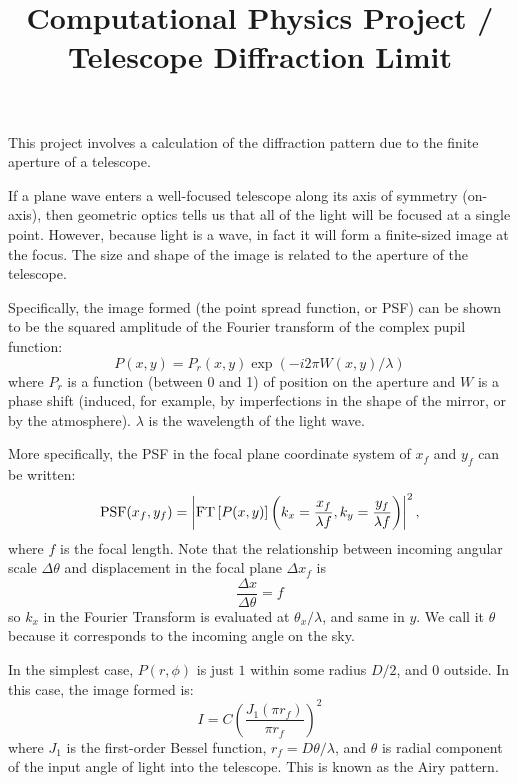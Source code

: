 \documentclass[11pt, preprint]{aastex}
\begin{document}
\title{\bf Computational Physics Project / Telescope Diffraction Limit}

This project involves a calculation of the diffraction pattern due to
the finite aperture of a telescope.

If a plane wave enters a well-focused telescope along its axis of
symmetry (on-axis), then geometric optics tells us that all of the
light will be focused at a single point. However, because light is a
wave, in fact it will form a finite-sized image at the focus. The size
and shape of the image is related to the aperture of the telescope.

Specifically, the image formed (the point spread function, or PSF) can
be shown to be the squared amplitude of the Fourier transform of the
complex pupil function:
\begin{equation}
P(x,y) = P_r(x, y) \exp\left(-i 2\pi W(x, y) / \lambda\right)
\end{equation}
where $P_r$ is a function (between 0 and 1) of position on the
aperture and $W$ is a phase shift (induced, for example, by
imperfections in the shape of the mirror, or by the
atmosphere). $\lambda$ is the wavelength of the light wave.

More specifically, the PSF in the focal plane coordinate system of
$x_f$ and $y_f$ can be written:
\begin{equation}
{\rm PSF}(x_f, y_f) = \left| {\rm FT}\left[P(x, y)\right]\left(k_x=
\frac{x_f}{\lambda f}, k_y = \frac{y_f}{\lambda f}\right) \right|^2,
\end{equation}
where $f$ is the focal length. Note that the relationship between
incoming angular scale $\Delta\theta$ and displacement in the focal
plane $\Delta x_f$ is
\begin{equation}
\frac{\Delta x}{\Delta\theta} = f
\end{equation}
so $k_x$ in the Fourier Transform is evaluated at $\theta_x /
\lambda$, and same in $y$. We call it $\theta$ because it corresponds
to the incoming angle on the sky.

In the simplest case, $P(r, \phi)$ is just $1$ within some radius
$D/2$, and $0$ outside.  In this case, the image formed is:
\begin{equation}
I = C\left(\frac{J_1(\pi r_f)}{\pi r_f}\right)^2
\end{equation}
where $J_1$ is the first-order Bessel function, $r_f=
D\theta/\lambda$, and $\theta$ is radial component of the input angle
of light into the telescope.  This is known as the Airy pattern.
\end{document}
